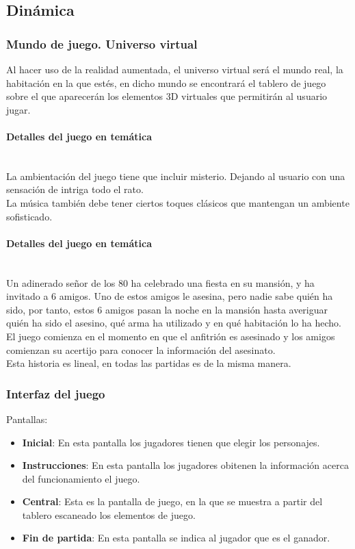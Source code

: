 \subsection{Dinámica}
\subsubsection{Mundo de juego. Universo virtual}
Al hacer uso de la realidad aumentada, el universo virtual será el mundo real, la habitación en la que estés, en dicho mundo se encontrará el tablero de juego sobre el que aparecerán los elementos 3D virtuales que permitirán al usuario jugar.

\paragraph{Detalles del juego en temática}\mbox{}\\
La ambientación del juego tiene que incluir misterio. Dejando al usuario con una sensación de intriga todo el rato.\\

La música también debe tener ciertos toques clásicos que mantengan un ambiente sofisticado.

\paragraph{Detalles del juego en temática}\mbox{}\\
Un adinerado señor de los 80 ha celebrado una fiesta en su mansión, y ha invitado a 6 amigos. Uno de estos amigos le asesina, pero nadie sabe quién ha sido, por tanto, estos 6 amigos pasan la noche en la mansión hasta averiguar quién ha sido el asesino, qué arma ha utilizado y en qué habitación lo ha hecho.\\

El juego comienza en el momento en que el anfitrión es asesinado y los amigos comienzan su acertijo para conocer la información del asesinato.\\

Esta historia es lineal, en todas las partidas es de la misma manera.

\subsubsection{Interfaz del juego}
Pantallas:
\begin{itemize}
  \item \textbf{Inicial}: En esta pantalla los jugadores tienen que elegir los personajes.
  \item \textbf{Instrucciones}: En esta pantalla los jugadores obitenen la información acerca del funcionamiento el juego.
  \item \textbf{Central}: Esta es la pantalla de juego, en la que se muestra a partir del tablero escaneado los elementos de juego.
  \item \textbf{Fin de partida}: En esta pantalla se indica al jugador que es el ganador.
\end{itemize}

